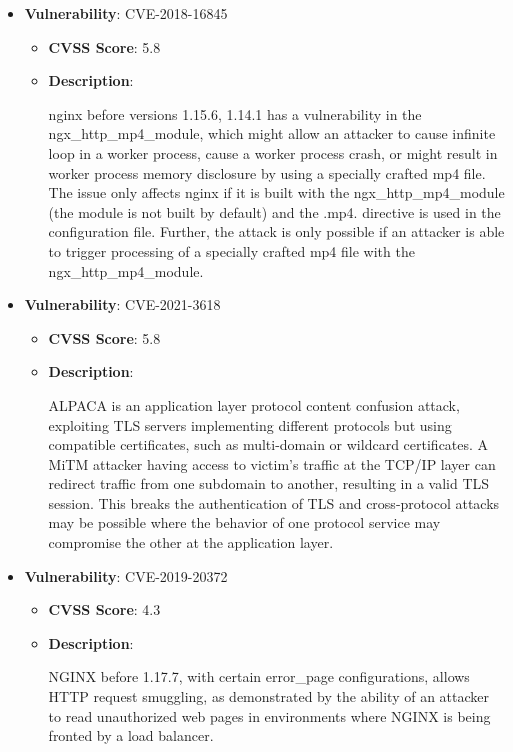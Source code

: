 \documentclass{article}
\begin{document}
\begin{itemize}
        \item \textbf{Vulnerability}: CVE-2018-16845
        \begin{itemize}
            \item \textbf{CVSS Score}:  5.8 
            \item \textbf{Description}:
            \parbox[t]{0.9\linewidth}{
                \ttfamily nginx before versions 1.15.6, 1.14.1 has a vulnerability in the ngx\_http\_mp4\_module, which might allow an attacker to cause infinite loop in a worker process, cause a worker process crash, or might result in worker process memory disclosure by using a specially crafted mp4 file. The issue only affects nginx if it is built with the ngx\_http\_mp4\_module (the module is not built by default) and the .mp4. directive is used in the configuration file. Further, the attack is only possible if an attacker is able to trigger processing of a specially crafted mp4 file with the ngx\_http\_mp4\_module.
            }
        \end{itemize}
    
        \item \textbf{Vulnerability}: CVE-2021-3618
        \begin{itemize}
            \item \textbf{CVSS Score}:  5.8 
            \item \textbf{Description}:
            \parbox[t]{0.9\linewidth}{
                \ttfamily ALPACA is an application layer protocol content confusion attack, exploiting TLS servers implementing different protocols but using compatible certificates, such as multi-domain or wildcard certificates. A MiTM attacker having access to victim's traffic at the TCP/IP layer can redirect traffic from one subdomain to another, resulting in a valid TLS session. This breaks the authentication of TLS and cross-protocol attacks may be possible where the behavior of one protocol service may compromise the other at the application layer.
            }
        \end{itemize}
    
        \item \textbf{Vulnerability}: CVE-2019-20372
        \begin{itemize}
            \item \textbf{CVSS Score}:  4.3 
            \item \textbf{Description}:
            \parbox[t]{0.9\linewidth}{
                \ttfamily NGINX before 1.17.7, with certain error\_page configurations, allows HTTP request smuggling, as demonstrated by the ability of an attacker to read unauthorized web pages in environments where NGINX is being fronted by a load balancer.
            }
        \end{itemize}
    

\end{itemize}
\end{document}
